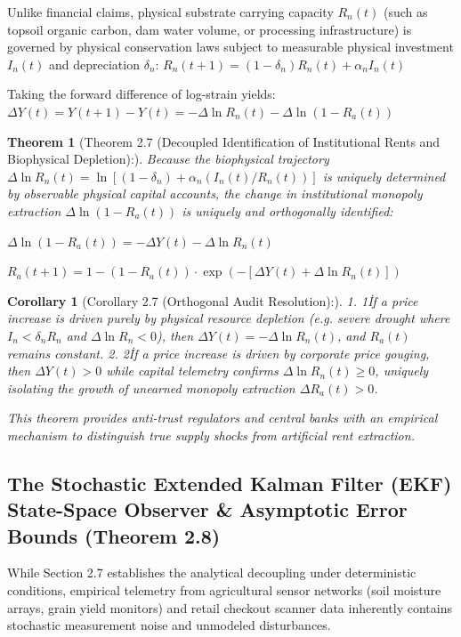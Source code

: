 \documentclass[preprint,12pt,authoryear]{elsarticle}
\newtheorem{theorem}{Theorem}
\newtheorem{corollary}{Corollary}
\theoremstyle{definition}
\begin{document}
Unlike financial claims, physical substrate carrying capacity $R_n(t)$ (such as topsoil organic carbon, dam water volume, or processing infrastructure) is governed by physical conservation laws subject to measurable physical investment $I_n(t)$ and depreciation $\delta_n$:  
$R_n(t+1) = (1 - \delta_n) R_n(t) + \alpha_n I_n(t)$

Taking the forward difference of log-strain yields:  
$\Delta Y(t) = Y(t+1) - Y(t) = -\Delta \ln R_n(t) - \Delta \ln(1 - R_a(t))$

\begin{theorem}[Theorem 2.7 (Decoupled Identification of Institutional Rents and Biophysical Depletion):] Because the biophysical trajectory $\Delta \ln R_n(t) = \ln[ (1 - \delta_n) + \alpha_n (I_n(t) / R_n(t)) ]$ is uniquely determined by observable physical capital accounts, the change in institutional monopoly extraction $\Delta \ln(1 - R_a(t))$ is uniquely and orthogonally identified:

$\Delta \ln(1 - R_a(t)) = -\Delta Y(t) - \Delta \ln R_n(t)$

$R_a(t+1) = 1 - (1 - R_a(t)) \cdot \exp\left( -[\Delta Y(t) + \Delta \ln R_n(t)] \right)$
\end{theorem}

\begin{corollary}[Corollary 2.7 (Orthogonal Audit Resolution):]

1.  1\. If a price increase is driven purely by physical resource depletion (e.g. severe drought where $I_n < \delta_n R_n$ and $\Delta \ln R_n < 0$), then $\Delta Y(t) = -\Delta \ln R_n(t)$, and $R_a(t)$ remains constant.
2.  2\. If a price increase is driven by corporate price gouging, then $\Delta Y(t) > 0$ while capital telemetry confirms $\Delta \ln R_n(t) \ge 0$, uniquely isolating the growth of unearned monopoly extraction $\Delta R_a(t) > 0$.

This theorem provides anti-trust regulators and central banks with an empirical mechanism to distinguish true supply shocks from artificial rent extraction.
\end{corollary}

\subsection{The Stochastic Extended Kalman Filter (EKF) State-Space Observer \& Asymptotic Error Bounds (Theorem 2.8)}

While Section 2.7 establishes the analytical decoupling under deterministic conditions, empirical telemetry from agricultural sensor networks (soil moisture arrays, grain yield monitors) and retail checkout scanner data inherently contains stochastic measurement noise and unmodeled disturbances. 
\end{document}
